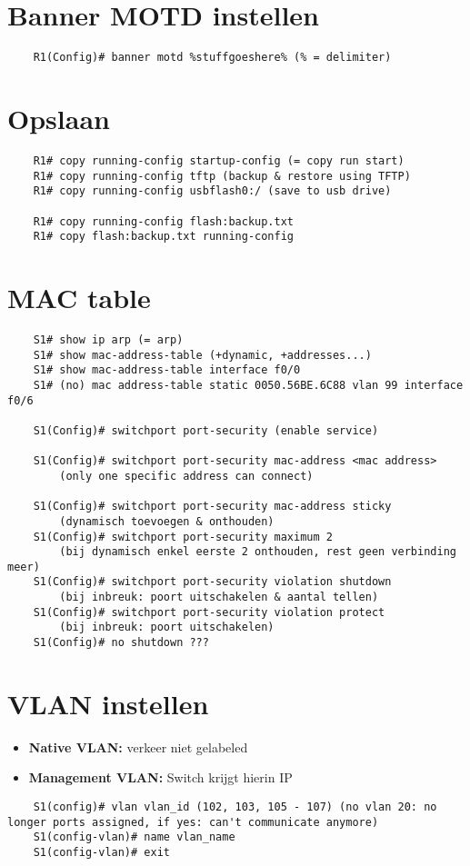 \documentclass[10pt, a4paper]{article}
\begin{document}
	\section{Banner MOTD instellen}
	\begin{lstlisting}
	R1(Config)# banner motd %stuffgoeshere% (% = delimiter)
	\end{lstlisting}
	
	\section{Opslaan}
	\begin{lstlisting}
	R1# copy running-config startup-config (= copy run start)
	R1# copy running-config tftp (backup & restore using TFTP)
	R1# copy running-config usbflash0:/ (save to usb drive)
	
	R1# copy running-config flash:backup.txt
	R1# copy flash:backup.txt running-config
	\end{lstlisting}
	
	\section{MAC table}
	\begin{lstlisting}
	S1# show ip arp (= arp)
	S1# show mac-address-table (+dynamic, +addresses...)
	S1# show mac-address-table interface f0/0
	S1# (no) mac address-table static 0050.56BE.6C88 vlan 99 interface f0/6
	
	S1(Config)# switchport port-security (enable service)
	
	S1(Config)# switchport port-security mac-address <mac address> 
		(only one specific address can connect)
	
	S1(Config)# switchport port-security mac-address sticky 
		(dynamisch toevoegen & onthouden)
	S1(Config)# switchport port-security maximum 2 
		(bij dynamisch enkel eerste 2 onthouden, rest geen verbinding meer)
	S1(Config)# switchport port-security violation shutdown 
		(bij inbreuk: poort uitschakelen & aantal tellen)
	S1(Config)# switchport port-security violation protect 
		(bij inbreuk: poort uitschakelen)
	S1(Config)# no shutdown ???
	\end{lstlisting}
	
	\section{VLAN instellen}
		\begin{itemize}[noitemsep,nolistsep]
			\item \textbf{Native VLAN:} verkeer niet gelabeled
			\item \textbf{Management VLAN:} Switch krijgt hierin IP\\
		\end{itemize}
	\begin{lstlisting}
	S1(config)# vlan vlan_id (102, 103, 105 - 107) (no vlan 20: no longer ports assigned, if yes: can't communicate anymore)
	S1(config-vlan)# name vlan_name
	S1(config-vlan)# exit
	\end{lstlisting}
	
\end{document}
